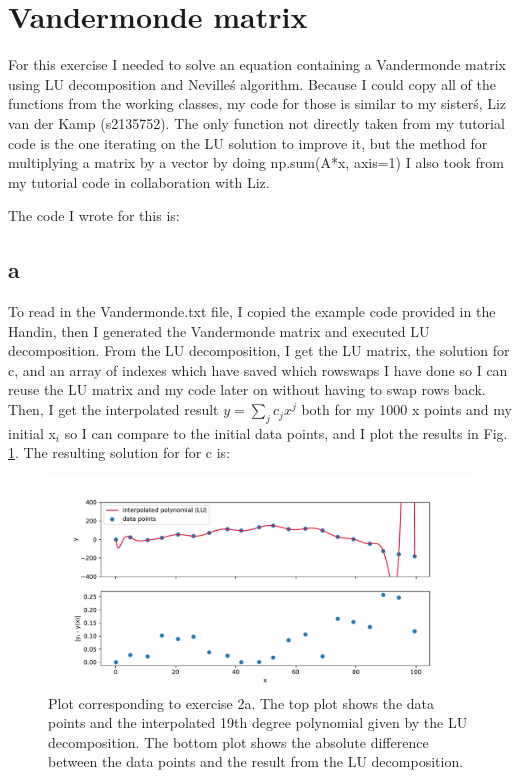 \section{Vandermonde matrix}

For this exercise I needed to solve an equation containing a Vandermonde matrix using LU decomposition and Neville\'s algorithm.
Because I could copy all of the functions from the working classes, 
my code for those is similar to my sister\'s, Liz van der Kamp (s2135752). 
The only function not directly taken from my tutorial code is the one iterating on the LU solution to improve it, 
but the method for multiplying a matrix by a vector by doing np.sum(A*x, axis=1) I also took from my tutorial code in collaboration with Liz.

The code I wrote for this is:


\subsection{a}
To read in the Vandermonde.txt file, I copied the example code provided in the Handin, 
then I generated the Vandermonde matrix and executed LU decomposition.
From the LU decomposition, I get the LU matrix, the solution for c, 
and an array of indexes which have saved which rowswaps I have done so I can reuse the LU matrix and my code later on without having to swap rows back.
Then, I get the interpolated result $y = \sum_j c_j x^j$ both for my 1000 x points and my initial x$_i$ so I can compare to the initial data points, 
and I plot the results in Fig. \ref{fig:fig1}.
The resulting solution for for c is:


\begin{figure}[h!]
  \centering
  \includegraphics[width=0.9\linewidth]{NUR1_Q2_plot1.pdf}
  \caption{Plot corresponding to exercise 2a. The top plot shows the data points 
  and the interpolated 19th degree polynomial given by the LU decomposition. The bottom plot shows the absolute difference between
  the data points and the result from the LU decomposition.}
  \label{fig:fig1}
\end{figure} 

